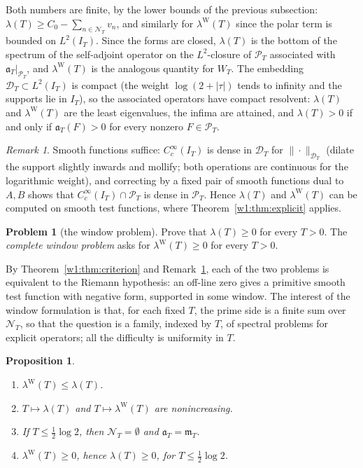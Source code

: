 \documentclass[11pt]{amsart}
\newtheorem{proposition}[theorem]{Proposition}
\theoremstyle{definition}
\newtheorem{problem}[theorem]{Problem}
\theoremstyle{remark}
\newtheorem{remark}[theorem]{Remark}
\numberwithin{equation}{section}
\newcommand{\IT}{I_T}                                  %
\newcommand{\PT}{\mathcal{P}_T}                        %
\newcommand{\DT}{\mathcal{D}_T}                        %
\newcommand{\NT}{\mathcal{N}_T}                        %
\newcommand{\mT}{\mathfrak{m}_T}                       %
\newcommand{\aT}{\mathfrak{a}_T}                       %
\newcommand{\WT}{W_T}                                  %
\newcommand{\lam}{\lambda(T)}                          %
\newcommand{\lamW}{\lambda^{\mathrm W}(T)}             %
\begin{document}
Both numbers are finite, by the lower bounds of the previous subsection:
$\lam\ge C_0-\sum_{n\in\NT}v_n$, and similarly for $\lamW$ since the polar term
is bounded on $L^2(\IT)$. Since the forms are closed, $\lam$ is the
bottom of the spectrum of the self-adjoint operator on the $L^2$-closure of
$\PT$ associated with $\aT|_{\PT}$, and $\lamW$ is the analogous quantity for
$\WT$. The embedding $\DT\subset L^2(\IT)$ is compact (the weight
$\log(2+|\tau|)$ tends to infinity and the supports lie in $\IT$), so the
associated operators have compact resolvent: $\lam$ and $\lamW$ are the least
eigenvalues, the infima are attained, and $\lam>0$ if and only if $\aT(F)>0$
for every nonzero $F\in\PT$.

\begin{remark}\label{w1:rem:density}
Smooth functions suffice: $C_c^\infty(\IT)$ is dense in $\DT$ for
$\|\cdot\|_{\DT}$ (dilate the support slightly inwards and mollify; both
operations are continuous for the logarithmic weight), and correcting by a
fixed pair of smooth functions dual to $A,B$ shows that $C_c^\infty(\IT)\cap\PT$
is dense in $\PT$. Hence $\lam$ and $\lamW$ can be computed on smooth test
functions, where Theorem~\ref{w1:thm:explicit} applies.
\end{remark}

\begin{problem}[the window problem]\label{w1:prob:window}
Prove that $\lam\ge0$ for every $T>0$. The \emph{complete window problem}
asks for $\lamW\ge0$ for every $T>0$.
\end{problem}

By Theorem~\ref{w1:thm:criterion} and Remark~\ref{w1:rem:density}, each of the
two problems is equivalent to the Riemann hypothesis: an off-line zero gives
a primitive smooth test function with negative form, supported in some
window. The interest of the window formulation is that, for each fixed $T$,
the prime side is a finite sum over $\NT$, so that the question is a
family, indexed by $T$, of spectral problems for explicit operators; all the
difficulty is uniformity in $T$.

\begin{proposition}\label{w1:prop:elementary}
\begin{enumerate}[label=(\roman*)]
\item $\lamW\le\lam$.
\item $T\mapsto\lam$ and $T\mapsto\lamW$ are nonincreasing.
\item If $T\le\frac12\log2$, then $\NT=\emptyset$ and $\aT=\mT$.
\item $\lamW\ge0$, hence $\lam\ge0$, for $T\le\frac12\log2$.
\end{enumerate}
\end{proposition}
\end{document}
